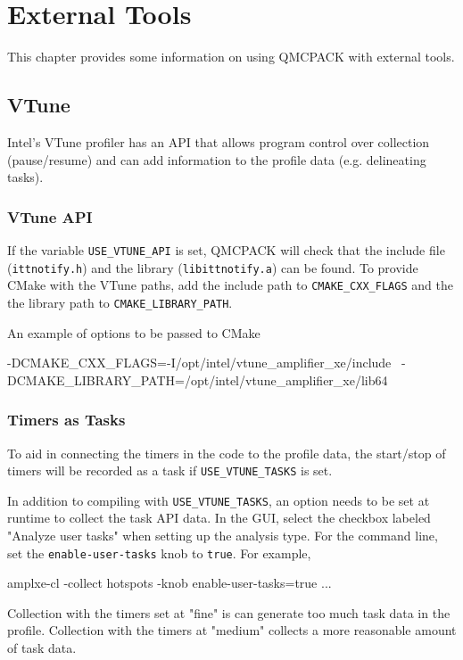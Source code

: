 \chapter{External Tools}
\label{chap:external_tools}
This chapter provides some information on using QMCPACK with external tools.

\section{VTune}

Intel's VTune profiler has an API that allows program control over collection (pause/resume) and can add information to the profile data (e.g. delineating tasks).

\subsection{VTune API}

If the variable \texttt{USE\_VTUNE\_API} is set, QMCPACK will check that the
include file (\texttt{ittnotify.h}) and the library (\texttt{libittnotify.a}) can
be found.
To provide CMake with the VTune paths, add the include path to \texttt{CMAKE\_CXX\_FLAGS} and the the library path to \texttt{CMAKE\_LIBRARY\_PATH}.

An example of options to be passed to CMake
\begin{shade}
 -DCMAKE_CXX_FLAGS=-I/opt/intel/vtune_amplifier_xe/include \
 -DCMAKE_LIBRARY_PATH=/opt/intel/vtune_amplifier_xe/lib64
\end{shade}


\subsection{Timers as Tasks}
To aid in connecting the timers in the code to the profile data, the start/stop of
timers will be recorded as a task if \texttt{USE\_VTUNE\_TASKS} is set.

In addition to compiling with \texttt{USE\_VTUNE\_TASKS}, an option needs to be set at runtime to collect the task API data.
In the GUI, select the checkbox labeled "Analyze user tasks" when setting up the analysis type.
For the command line, set the \texttt{enable-user-tasks} knob to \texttt{true}. For example,
\begin{shade}
amplxe-cl -collect hotspots -knob enable-user-tasks=true ...
\end{shade}

Collection with the timers set at "fine" is can generate too much task data in the profile.
Collection with the timers at "medium" collects a more reasonable amount of task data.
